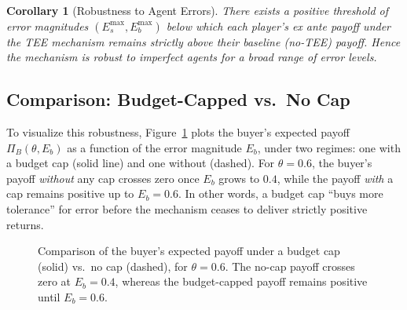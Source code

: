 \documentclass{article}
\newtheorem{corollary}{Corollary}
\begin{document}
\begin{corollary}[Robustness to Agent Errors]\label{cor:robust-error}
There exists a positive threshold of error magnitudes $(E_s^{\max}, E_b^{\max})$ below which each player’s ex ante payoff under the TEE mechanism remains strictly above their baseline (no-TEE) payoff. Hence the mechanism is robust to imperfect agents for a broad range of error levels.
\end{corollary}

\medskip

\subsection*{Comparison: Budget-Capped vs.\ No Cap}
To visualize this robustness, Figure~\ref{fig:no-cap-vs-cap} plots the buyer’s expected payoff $\Pi_B(\theta,E_b)$ as a function of the error magnitude $E_b$, under two regimes: one with a budget cap (solid line) and one without (dashed). For $\theta = 0.6$, the buyer’s payoff \emph{without} any cap crosses zero once $E_b$ grows to $0.4$, while the payoff \emph{with} a cap remains positive up to $E_b = 0.6$. In other words, a budget cap “buys more tolerance” for error before the mechanism ceases to deliver strictly positive returns.

\begin{figure}[ht]
\centering
{}
\caption{Comparison of the buyer’s expected payoff under a budget cap (solid) vs.\ no cap
(dashed), for $\theta = 0.6$. The no-cap payoff crosses zero at $E_b=0.4$, whereas the
budget-capped payoff remains positive until $E_b=0.6$.}
\label{fig:no-cap-vs-cap}
\end{figure}
\end{document}
